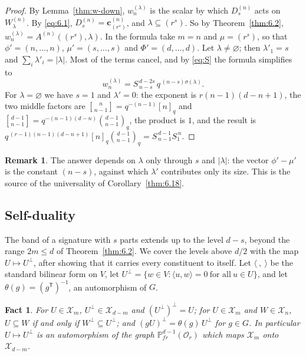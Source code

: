 \documentclass[11pt]{article}
\numberwithin{equation}{section}
\theoremstyle{plain}
\newtheorem{fact}[theorem]{Fact}
\theoremstyle{definition}
\newtheorem{remark}[theorem]{Remark}
\begin{document}
\begin{proof}
By Lemma~\ref{thm:w-down}, $w^{(\lambda)}_n$ is the scalar by which $D^{(n)}_{s}$ acts on
$W^{(n)}_\lambda$. By \eqref{eq:6.1}, $D^{(n)}_{s}=\mathbf c^{(n)}_{(r^{s})}$, and
$\lambda\subseteq(r^s)$. So by Theorem~\ref{thm:6.2},
$w^{(\lambda)}_n=A^{(n)}((r^{s}),\lambda)$. In the formula take $m=n$ and $\mu=(r^s)$, so
that $\phi'=(n,\dots,n)$, $\mu'=(s,\dots,s)$ and $\Phi'=(d,\dots,d)$. Let
$\lambda\ne\varnothing$; then $\lambda'_1=s$ and $\sum_i\lambda'_i=|\lambda|$. Most of the
terms cancel, and by \eqref{eq:S} the formula simplifies to
\[
w^{(\lambda)}_n=S^{\,d-2s}_{\,n-s}\,q^{\,(n-s)\sigma(\lambda)} .
\]
For $\lambda=\varnothing$ we have $s=1$ and $\lambda'=0$: the exponent is $r(n-1)(d-n+1)$,
the two middle factors are $\genfrac{[}{]}{0pt}{}{n}{n-1}=q^{-(n-1)}[n]_q$ and
$\genfrac{[}{]}{0pt}{}{d-1}{n-1}=q^{-(n-1)(d-n)}\binom{d-1}{n-1}_q$, the product is $1$, and the result is
$q^{\,(r-1)(n-1)(d-n+1)}[n]_q\binom{d-1}{n-1}_q=S^{\,d-1}_{\,n-1}S^{\,n}_1$.
\end{proof}

\begin{remark}\label{thm:6.5}
The answer depends on $\lambda$ only through $s$ and $|\lambda|$: the vector
$\phi'-\mu'$ is the constant $(n-s)$, against which $\lambda'$ contributes only its
size. This is the source of the universality of Corollary~\ref{thm:6.18}.
\end{remark}

\subsection{Self-duality}\label{sec:6.2}

The band of a signature with $s$ parts extends up to the level $d-s$, beyond the range
$2m\le d$ of Theorem~\ref{thm:6.2}. We cover the levels above $d/2$ with the map
$U\mapsto U^\perp$, after showing that it carries every constituent to itself. Let
$\langle\ ,\ \rangle$ be the standard bilinear form on $V$, let
$U^\perp=\{w\in V:\langle u,w\rangle=0\ \text{for all}\ u\in U\}$, and let
$\theta(g)=(g^{\mathsf T})^{-1}$, an automorphism of $G$.

\begin{fact}\label{thm:6.6}
For $U\in \mathcal{X}_m$, $U^\perp\in \mathcal{X}_{d-m}$ and $(U^\perp)^\perp=U$; for
$U\in \mathcal{X}_m$ and $W\in \mathcal{X}_n$, $U\subseteq W$ if and only if $W^\perp\subseteq U^\perp$;
and $(gU)^\perp=\theta(g)\,U^\perp$ for $g\in G$. In particular $U\mapsto U^\perp$ is an
automorphism of the graph $\mathbb{P}^{d-1}_{fr}(\mathcal{O}_r)$ which maps $\mathcal{X}_m$ onto $\mathcal{X}_{d-m}$.
\end{fact}
\end{document}
